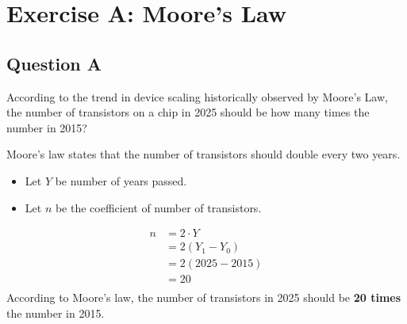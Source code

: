 \documentclass[12pt]{article}
\newenvironment{sol}[1][Solution]{\begin{trivlist}
		\item[\hskip \labelsep {\bfseries {#1}:}]}{\end{trivlist}}
\newcommand{\Let}[2]{Let {$#1$} be #2.}
\begin{document}
\title{\doctitle}
\author{\ponename}
\date{\today}
\maketitle
\thispagestyle{empty} %


\newpage
\setcounter{page}{1}

\bigskip

\section*{Exercise A: Moore's Law}
\subsection*{Question A}
According to the trend in device scaling historically observed by Moore’s Law, the number of transistors on a chip in 2025 should be how many times the number in 2015? \cite{hennessey2019computer}
\begin{sol}
	Moore's law states that the number of transistors should double every two years.
	\begin{itemize}
		\item \Let{Y}{number of years passed}
		\item \Let{n}{the coefficient of number of transistors}
	\end{itemize}
	\begin{align*}
		n & = 2\cdot{Y}    \\
		  & = 2(Y_1-Y_0)   \\
		  & = 2(2025-2015) \\
		  & = 20           \\
	\end{align*}
	According to Moore's law, the number of transistors in 2025 should be \textbf{20 times} the number in 2015.
\end{sol}

\pagebreak
\printbibliography

\end{document}
